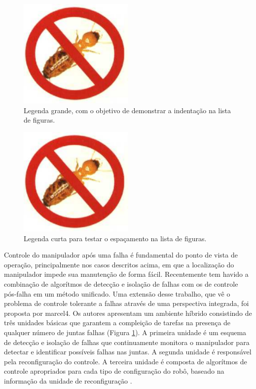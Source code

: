 \begin{figure}[ht]
\centering
\includegraphics[width=0.5\textwidth]{texts/cap1/figs/cupim}
\caption{Legenda grande, com o objetivo de demonstrar a indentação na lista de figuras.}
\label{cupim}
\end{figure}

\begin{figure}[ht]
\centering
\includegraphics[width=0.5\textwidth]{texts/cap1/figs/cupim}
\caption{Legenda curta para testar o espaçamento na lista de figuras.}
\label{cupim2}
\end{figure}

Controle do manipulador após uma falha é fundamental do ponto de vista de operação, principalmente nos casos descritos acima, em que a localização do manipulador impede sua manutenção de forma fácil. Recentemente tem havido a combinação
de algorítmos de detecção e isolação de falhas com os de controle pós-falha em um método unificado. Uma extensão desse trabalho, que vê o problema de controle tolerante a falhas através de uma perspectiva integrada, foi proposta por
{marcel4}. Os autores apresentam um ambiente híbrido consistindo de três unidades básicas que garantem a compleição de tarefas na presença de qualquer número de juntas falhas (Figura \ref{cupim}). A primeira unidade é um esquema de detecção
e isolação de falhas que continuamente monitora o manipulador para detectar e identificar possíveis falhas nas juntas. A segunda unidade é responsável pela reconfiguração do controle. A terceira unidade é composta de algorítmos de
controle apropriados para cada tipo de configuração do robô, baseado na informação da unidade de reconfiguração \cite{COFFEE2000}.


